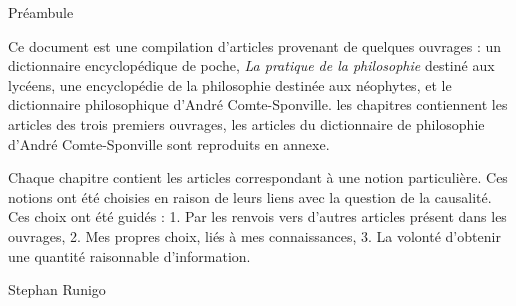 
\thispagestyle{empty}

\begin{center}
\Large
Préambule
\normalsize
\end{center}
\vspace{3cm}

Ce document est une compilation d'articles provenant de quelques ouvrages : un dictionnaire encyclopédique de poche, {\it La pratique de la philosophie} destiné aux lycéens, une encyclopédie de la philosophie destinée aux néophytes, et le dictionnaire philosophique d'André Comte-Sponville.
les chapitres contiennent les articles des trois premiers ouvrages, les articles du dictionnaire de philosophie d'André Comte-Sponville sont reproduits en annexe.

\vspace{1.3cm}

Chaque chapitre contient les articles correspondant à une notion particulière. Ces notions ont été choisies en raison de leurs liens avec la question de la causalité. Ces choix ont été guidés : 1. Par les renvois vers d'autres articles présent dans les ouvrages, 2. Mes propres choix, liés à mes connaissances, 3. La volonté d'obtenir une quantité raisonnable d'information.

\vspace{1.3cm}



\vspace{1.3cm}


\vspace{2.3cm}

\hfill Stephan Runigo


